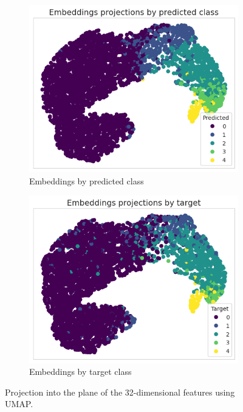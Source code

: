 \begin{figure}[tb]
     \centering
     \begin{subfigure}[b]{0.49\textwidth}
         \centering
         \includegraphics[width=\textwidth]{figures/chapter6/embeddings/embeddings_predicted.png}
         \caption{Embeddings by predicted class}
         \label{fig:embedding_predicted}
     \end{subfigure}
     \hfill
     \begin{subfigure}[b]{0.49\textwidth}
         \centering
         \includegraphics[width=\textwidth]{figures/chapter6/embeddings/embeddings_target.png}
         \caption{Embeddings by target class}
         \label{fig:embedding_target}
    \end{subfigure}
    \caption{Projection into the plane of the 32-dimensional features using UMAP. }
    \label{fig:embedding}
\end{figure}

